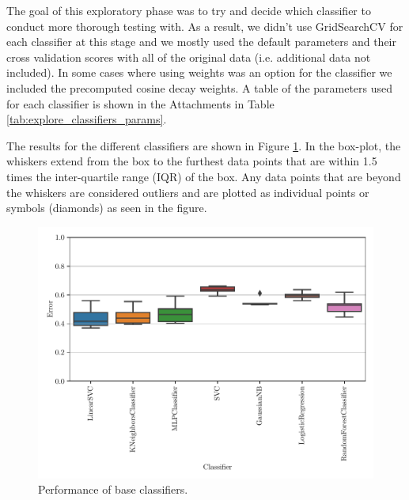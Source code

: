 The goal of this exploratory phase was to try and decide which classifier to conduct more thorough testing with. As a result, we didn't use GridSearchCV for each classifier at this stage and we mostly used the default parameters and their cross validation scores with all of the original data (i.e. additional data not included). In some cases where using weights was an option for the classifier we included the precomputed cosine decay weights. A table of the parameters used for each classifier is shown in the Attachments in Table \ref{tab:explore_classifiers_params}.


The results for the different classifiers are shown in Figure \ref{fig:explore_classifiers}. In the box-plot, the whiskers extend from the box to the furthest data points that are within 1.5 times the inter-quartile range (IQR) of the box. Any data points that are beyond the whiskers are considered outliers and are plotted as individual points or symbols (diamonds) as seen in the figure.

\begin{figure}[ht]
  \centering
  \includegraphics[width=\textwidth]{../img/plot_explore_classifiers}
  \caption{Performance of base classifiers.}
  \label{fig:explore_classifiers}
\end{figure} 

